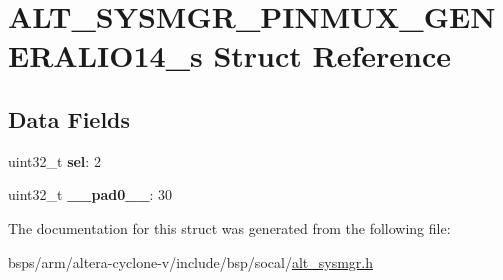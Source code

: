 \hypertarget{structALT__SYSMGR__PINMUX__GENERALIO14__s}{}\section{A\+L\+T\+\_\+\+S\+Y\+S\+M\+G\+R\+\_\+\+P\+I\+N\+M\+U\+X\+\_\+\+G\+E\+N\+E\+R\+A\+L\+I\+O14\+\_\+s Struct Reference}
\label{structALT__SYSMGR__PINMUX__GENERALIO14__s}
\subsection*{Data Fields}
\begin{DoxyCompactItemize}
\item 
\mbox{\label{structALT__SYSMGR__PINMUX__GENERALIO14__s_a25c59b1b36ac14b36b92fc470d5ba027}} 
uint32\+\_\+t {\bfseries sel}\+: 2
\item 
\mbox{\label{structALT__SYSMGR__PINMUX__GENERALIO14__s_a774b8dae9d3184151ee56300925625bb}} 
uint32\+\_\+t {\bfseries \+\_\+\+\_\+pad0\+\_\+\+\_\+}\+: 30
\end{DoxyCompactItemize}


The documentation for this struct was generated from the following file\+:\begin{DoxyCompactItemize}
\item 
bsps/arm/altera-\/cyclone-\/v/include/bsp/socal/\mbox{\hyperlink{alt__sysmgr_8h}{alt\+\_\+sysmgr.\+h}}\end{DoxyCompactItemize}
